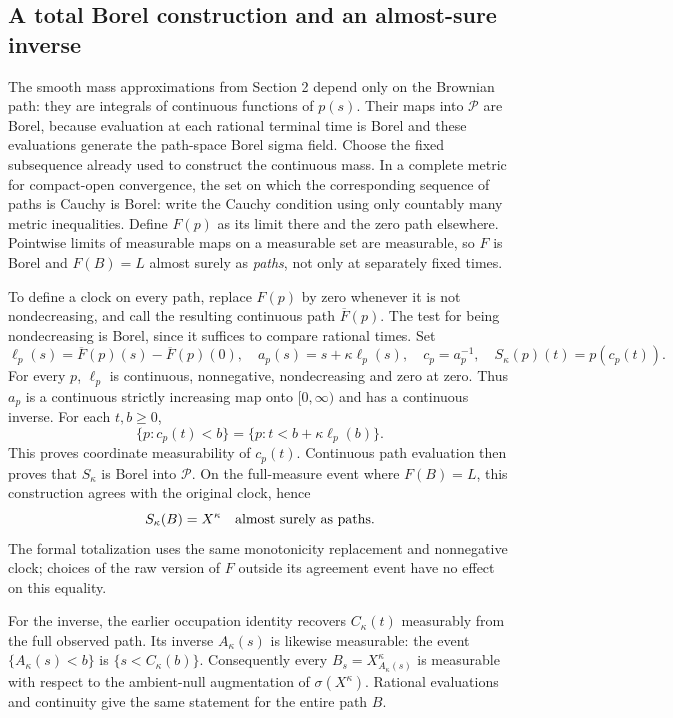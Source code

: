 \documentclass[11pt]{article}
\begin{document}
\subsection*{A total Borel construction and an almost-sure inverse}
The smooth mass approximations from Section 2 depend only on the
Brownian path: they are integrals of continuous functions of $p(s)$.
Their maps into $\mathcal P$ are Borel, because evaluation at each
rational terminal time is Borel and these evaluations generate the
path-space Borel sigma field. Choose the fixed subsequence already
used to construct the continuous mass. In a complete metric for
compact-open convergence, the set on which the corresponding sequence
of paths is Cauchy is Borel: write the Cauchy condition using only
countably many metric inequalities. Define $F(p)$ as its limit there
and the zero path elsewhere. Pointwise limits of measurable maps
on a measurable set are measurable, so $F$ is Borel and
$F(B)=L$ almost surely as \emph{paths}, not only at separately
fixed times.

To define a clock on every path, replace $F(p)$ by zero whenever
it is not nondecreasing, and call the resulting continuous path
$\overline F(p)$. The test for being nondecreasing is Borel, since
it suffices to compare rational times. Set
\[
 \ell_p(s)=\overline F(p)(s)-\overline F(p)(0),\quad
 a_p(s)=s+\kappa\ell_p(s),\quad c_p=a_p^{-1},\quad
 S_\kappa(p)(t)=p(c_p(t)).
\]
For every $p$, $\ell_p$ is continuous, nonnegative, nondecreasing
and zero at zero. Thus $a_p$ is a continuous strictly increasing
map onto $[0,\infty)$ and has a continuous inverse.
For each $t,b\geq0$,
\[
 \{p:c_p(t)<b\}=\{p:t<b+\kappa\ell_p(b)\}.
\]
This proves coordinate measurability of $c_p(t)$. Continuous path
evaluation then proves that $S_\kappa$ is Borel into $\mathcal P$.
On the full-measure event where $F(B)=L$, this construction agrees
with the original clock, hence
\begin{equation}\label{eq:pathforwardactual}
 S_\kappa(B)=X^\kappa\quad\hbox{almost surely as paths}.
\end{equation}
The formal totalization uses the same monotonicity replacement and
nonnegative clock; choices of the raw version of $F$ outside its
agreement event have no effect on this equality.

For the inverse, the earlier occupation identity recovers
$C_\kappa(t)$ measurably from the full observed path. Its inverse
$A_\kappa(s)$ is likewise measurable: the event
$\{A_\kappa(s)<b\}$ is $\{s<C_\kappa(b)\}$.
Consequently every $B_s=X^\kappa_{A_\kappa(s)}$ is measurable
with respect to the ambient-null augmentation of
$\sigma(X^\kappa)$. Rational evaluations and continuity give the
same statement for the entire path $B$.
\end{document}
